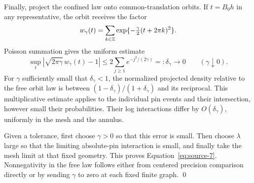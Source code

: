 Finally, project the confined law onto common-translation orbits.
If \(t=B_0h\) in any representative, the orbit receives the factor
\[
 w_\gamma(t)=\sum_{k\in\mathbb Z}
       \exp\{-\tfrac{\gamma}{2}(t+2\pi k)^2\}.
\]
Poisson summation gives the uniform estimate
\[
 \sup_t\left|\sqrt{2\pi\gamma}\,w_\gamma(t)-1\right|
 \le 2\sum_{j\ge1}e^{-j^2/(2\gamma)}
       =:\delta_\gamma\longrightarrow0
       \qquad(\gamma\downarrow0).
\]
For \(\gamma\) sufficiently small that \(\delta_\gamma<1\), the
normalized projected density relative to the free
orbit law is between
\((1-\delta_\gamma)/(1+\delta_\gamma)\) and its reciprocal.
This multiplicative estimate applies to the individual pin events
and their intersection, however small their probabilities. Their
log interactions differ by \(O(\delta_\gamma)\), uniformly in the
mesh and the annulus.

Given a tolerance, first choose \(\gamma>0\) so that this error is
small. Then choose \(\lambda\) large so that the limiting absolute-pin
interaction is small, and finally take the mesh limit at that
fixed geometry. This proves Equation~\eqref{eq:source-7}.
Nonnegativity in the free law follows either from centered
precision comparison directly or by sending \(\gamma\) to zero
at each fixed finite graph.
\qed
